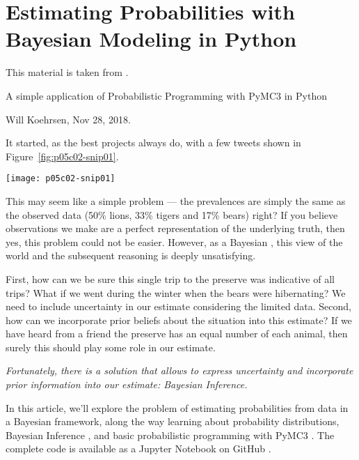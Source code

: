 
\chapter{Estimating Probabilities with Bayesian Modeling in Python}
\label{chap:EstimatingProbabilitieswithBayesianModelinginPython}


This material is taken from \cite{KoehrsenEstiBayes2018}.

A simple application of Probabilistic Programming with PyMC3 in Python

Will Koehrsen, Nov 28, 2018.

It started, as the best projects always do, with a few tweets shown in Figure~\ref{fig:p05c02-snip01}.


\begin{figure*}[h]
    \texttt{[image: p05c02-snip01]}
    \caption{Allen Downey tweets}
    \label{fig:p05c02-snip01}
    \end{figure*}


This may seem like a simple problem --- the prevalences are simply the same as the observed data (50\% lions, 33\% tigers and 17\% bears) right? If you believe observations we make are a perfect representation of the underlying truth, then yes, this problem could not be easier. However, as a Bayesian \cite{RationalWikiBayesian2019}, this view of the world and the subsequent reasoning is deeply unsatisfying.

First, how can we be sure this single trip to the preserve was indicative of all trips? What if we went during the winter when the bears were hibernating? We need to include uncertainty in our estimate considering the limited data. Second, how can we incorporate prior beliefs about the situation into this estimate? If we have heard from a friend the preserve has an equal number of each animal, then surely this should play some role in our estimate.

\textit{Fortunately, there is a solution that allows to express uncertainty and incorporate prior information into our estimate: Bayesian Inference.}

In this article, we'll explore the problem of estimating probabilities from data in a Bayesian framework, along the way learning about probability distributions, 
Bayesian Inference \cite{wikipediaBayesianinference2019}, and 
basic probabilistic programming \cite{CameronDavidsonPilonGitHub2019} \cite{CameronDavidsonPilonBlog2019} 
with PyMC3 \cite{PyMC3API2019}. The complete code is available as a Jupyter Notebook on GitHub \cite{KoehrsenEstiBayesGithub2018}.

